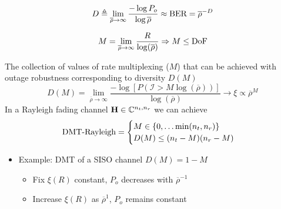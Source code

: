 \documentclass[xcolor=dvipsnames,aspectratio=169]{beamer}
\begin{document}
{\begin{definition}
 $$ D \triangleq \lim_{\overline{\rho}\to\infty} \frac{-\log P_o}{\log \overline{\rho}}\approx \textnormal{BER}=\overline{\rho}^{-D}$$
\end{definition}
\begin{definition}
$$M=\lim_{\overline{\rho}\to\infty}\frac{R}{\log(\overline{\rho})}\Rightarrow M\leq \textnormal{DoF}$$
\end{definition}
\pagebreak
\begin{theorem}
The collection of values of rate multiplexing ($M$) that can be achieved with outage robustness corresponding to diversity $D(M)$
$$D(M)=\lim_{\overline{\rho}\to\infty}\frac{-\log\left[P\left(\mathcal{I}>M\log(\overline{\rho})\right)\right]}{\log(\overline{\rho})}\to \xi\propto \overline{\rho}^{M}$$
 In a Rayleigh fading channel $\mathbf{H}\in\mathbb{C}^{n_t,n_r}$ we can achieve
 $$\textnormal{DMT-Rayleigh}=\begin{cases}
                            M\in\{0,\dots \min(n_t,n_r)\}\\
                            D(M)\leq (n_t-M)(n_r-M)
                           \end{cases}$$
\end{theorem}
 \begin{itemize}
  \item Example: DMT of a SISO channel $D(M)=1-M$
 \begin{itemize}
  \item Fix $\xi(R)$ constant, $P_o$ decreases with $\overline{\rho}^{-1}$
  \item Increase $\xi(R)$ as $\overline{\rho}^{1}$, $P_o$ remains constant
\end{itemize}
\end{itemize}

}
\end{document}
